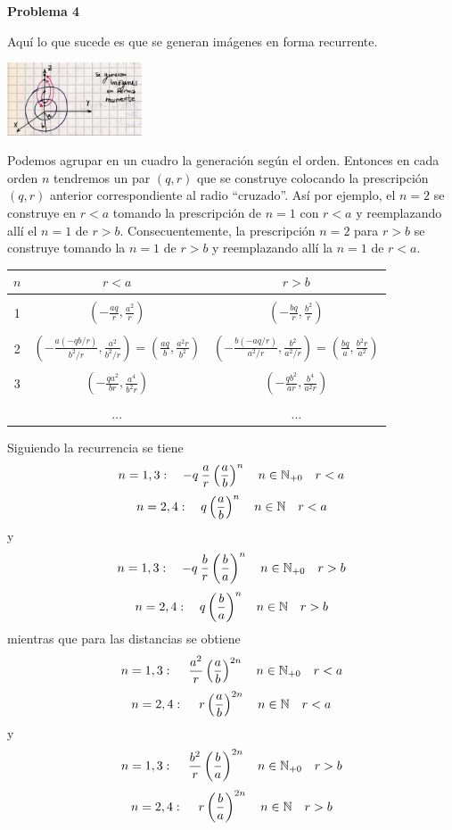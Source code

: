 \documentclass[10pt,oneside]{CBFT_book}
\begin{document}
\begin{ejemplo}{\bf Problema 4}

Aquí lo que sucede es que se generan imágenes en forma recurrente.

\includegraphics[width=0.3\textwidth]{images/fig_ft1_problema4.jpg}

Podemos agrupar en un cuadro la generación según el orden. Entonces
en cada orden $n$ tendremos un par $(q,r)$ que se construye colocando
la prescripción $(q,r)$ anterior correspondiente al radio ``cruzado''.
Así por ejemplo, el $n=2$ se construye en $r<a$ tomando la prescripción
de $n=1$ con $r<a$ y reemplazando allí el $n=1$ de $r>b$. Consecuentemente,
la prescripción $n=2$ para $r>b$ se construye tomando la $n=1$ de $r>b$ y
reemplazando allí la $n=1$ de $r<a$.

\begin{center}
\begin{tabular}{c|c|c}
$n$ & $r<a$ & $r> b$ \\
\hline
& & \\
1 & $\displaystyle \left( -\frac{aq}{r}, \frac{a^2}{r} \right)$ & 
$\displaystyle \left( -\frac{bq}{r}, \frac{b^2}{r} \right)$ \\
& & \\
2 & $\displaystyle \left( -\frac{a (-qb/r)}{b^2/r}, \frac{a^2}{b^2/r} \right) =
\displaystyle \left( \frac{aq}{b}, \frac{a^2r}{b^2} \right)$ & 
$\displaystyle \left( -\frac{b(-aq/r)}{a^2/r}, \frac{b^2}{a^2/r} \right) = 
\displaystyle \left( \frac{bq}{a}, \frac{b^2r}{a^2} \right) $ \\
& & \\
3 & $\displaystyle \left( -\frac{qa^2}{br}, \frac{a^4}{b^2r} \right)$ & 
$\displaystyle \left( -\frac{qb^2}{ar}, \frac{b^4}{a^2r} \right)$ \\
& & \\
 & ... & ...
\end{tabular}
\end{center}

Siguiendo la recurrencia se tiene 
\[
	n=1,3 : \quad - q \: \frac{a}{r}\left( \frac{ a }{ b } \right)^n \quad n \in \mathbb{N}_{+0} \quad r < a
\]
\[
	n=2,4 : \quad q \left( \frac{ a }{ b } \right)^n \quad n \in \mathbb{N} \quad r < a
\]
y
\[
	n=1,3 : \quad - q \: \frac{b}{r}\left( \frac{ b }{ a } \right)^n \quad n \in \mathbb{N}_{+0} \quad r > b
\]
\[
	n=2,4 : \quad q \left( \frac{ b }{ a } \right)^n \quad n \in \mathbb{N} \quad r > b
\]
mientras que para las distancias se obtiene
\[
	n=1,3 : \quad  \: \frac{a^2}{r}\left( \frac{ a }{ b } \right)^{2n} \quad n \in \mathbb{N}_{+0} \quad r < a
\]
\[
	n=2,4 : \quad \: r\left( \frac{ a }{ b } \right)^{2n} \quad n \in \mathbb{N} \quad r < a
\]
y
\[
	n=1,3 : \quad \: \frac{b^2}{r}\left( \frac{ b }{ a } \right)^{2n} \quad n \in \mathbb{N}_{+0} \quad r > b
\]
\[
	n=2,4 : \quad \: r\left( \frac{ b }{ a } \right)^{2n} \quad n \in \mathbb{N} \quad r > b
\]


\end{ejemplo}
\end{document}
